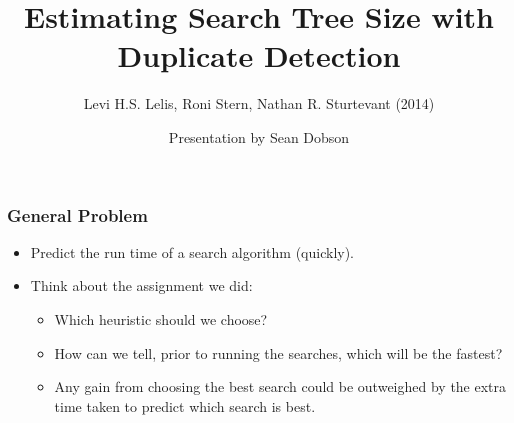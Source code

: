 \documentclass{beamer}
\begin{document}
\title{Estimating Search Tree Size with Duplicate Detection}
\subtitle{Levi H.S. Lelis, Roni Stern, Nathan R. Sturtevant (2014)}
\author{Presentation by Sean Dobson}

\frame{\titlepage}

\begin{frame}
  \frametitle{General Problem}
  \begin{itemize}
  \item Predict the run time of a search algorithm (quickly).
  \item Think about the assignment we did:
    \begin{itemize}
    \item Which heuristic should we choose?
    \item How can we tell, prior to running the searches, which will be the fastest?
    \item Any gain from choosing the best search could be outweighed by the extra time taken to predict which search is best.
    \end{itemize}
  \end{itemize}
\end{frame}
\end{document}
